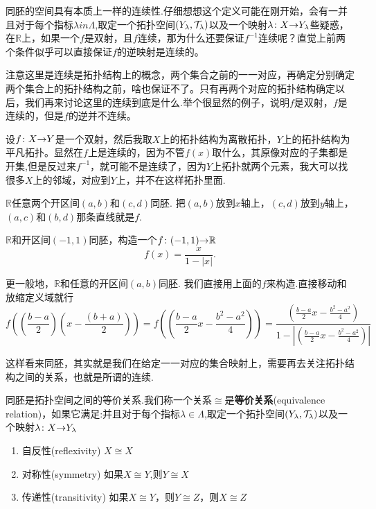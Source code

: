 同胚的空间具有本质上一样的连续性.仔细想想这个定义可能在刚开始，会有一并且对于每个指标$\lambda in \Lambda$,取定一个拓扑空间$(Y_\lambda,\mathcal{T}_\lambda)$以及一个映射${\lambda}\colon{X}{\to}{Y_\lambda}$些疑惑，在$\mathbb{R}$上，如果一个$f$是双射，且$f$连续，那为什么还要保证$f^{-1}$连续呢？直觉上前两个条件似乎可以直接保证$f$的逆映射是连续的。

注意这里是连续是拓扑结构上的概念，两个集合之前的一一对应，再确定分别确定两个集合上的拓扑结构之前，啥也保证不了。只有再两个对应的拓扑结构确定以后，我们再来讨论这里的连续到底是什么.举个很显然的例子，说明$f$是双射，$f$是连续的，但是$f$的逆并不连续。

\begin{example}
设${f}\colon{X}{\to}{Y}$是一个双射，然后我取$X$上的拓扑结构为离散拓扑，$Y$上的拓扑结构为平凡拓扑。显然在$f$上是连续的，因为不管$f(x)$取什么，其原像对应的子集都是开集,但是反过来$f^{-1}$，就可能不是连续了，因为$Y$上拓扑就两个元素，我大可以找很多$X$上的邻域，对应到$Y$上，并不在这样拓扑里面.
\end{example}

\begin{example}
$\mathbb{R}$任意两个开区间$(a,b)$和$(c,d)$同胚. 把$(a,b)$放到$x$轴上，$(c,d)$放到$y$轴上，$(a,c)$和$(b,d)$那条直线就是$f$. 
\end{example}

\begin{example}
$\mathbb{R}$和开区间$(-1,1)$同胚，构造一个${f}\colon{(-1,1)}{\to}{\mathbb{R}}$\[f(x)=\frac{x}{1-|x|}.\]
\end{example}

\begin{example}
更一般地，$\mathbb{R}$和任意的开区间$(a,b)$同胚. 我们直接用上面的$f$来构造.直接移动和放缩定义域就行\[f((\frac{b-a}{2})(x-\frac{(b+a)}{2}))=f((\frac{b-a}{2}x-\frac{b^2-a^2}{4}))=\frac{(\frac{b-a}{2}x-\frac{b^2-a^2}{4})}{1-|(\frac{b-a}{2}x-\frac{b^2-a^2}{4})|}\]
\end{example}

这样看来同胚，其实就是我们在给定一一对应的集合映射上，需要再去关注拓扑结构之间的关系，也就是所谓的连续.

\begin{theorem}
同胚是拓扑空间之间的等价关系.我们称一个关系$\cong$是\textbf{等价关系}(equivalence relation)，如果它满足:并且对于每个指标$\lambda \in \Lambda$,取定一个拓扑空间$(Y_\lambda,\mathcal{T}_\lambda)$以及一个映射${\lambda}\colon{X}{\to}{Y_\lambda}$
\begin{enumerate}
	\item 自反性(reflexivity) $X \cong X$
	\item 对称性(symmetry) 如果$X \cong Y$,则$Y \cong X$ 
	\item 传递性(transitivity) 如果$X \cong Y$，则$Y \cong Z$，则$X \cong Z$
\end{enumerate}
\end{theorem}

